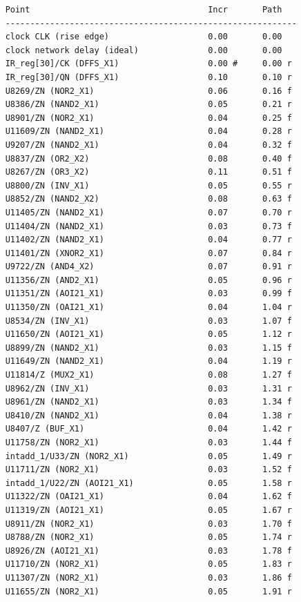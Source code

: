 \begin{lstlisting}
	Point                                    Incr       Path
	-----------------------------------------------------------
	clock CLK (rise edge)                    0.00       0.00
	clock network delay (ideal)              0.00       0.00
	IR_reg[30]/CK (DFFS_X1)                  0.00 #     0.00 r
	IR_reg[30]/QN (DFFS_X1)                  0.10       0.10 r
	U8269/ZN (NOR2_X1)                       0.06       0.16 f
	U8386/ZN (NAND2_X1)                      0.05       0.21 r
	U8901/ZN (NOR2_X1)                       0.04       0.25 f
	U11609/ZN (NAND2_X1)                     0.04       0.28 r
	U9207/ZN (NAND2_X1)                      0.04       0.32 f
	U8837/ZN (OR2_X2)                        0.08       0.40 f
	U8267/ZN (OR3_X2)                        0.11       0.51 f
	U8800/ZN (INV_X1)                        0.05       0.55 r
	U8852/ZN (NAND2_X2)                      0.08       0.63 f
	U11405/ZN (NAND2_X1)                     0.07       0.70 r
	U11404/ZN (NAND2_X1)                     0.03       0.73 f
	U11402/ZN (NAND2_X1)                     0.04       0.77 r
	U11401/ZN (XNOR2_X1)                     0.07       0.84 r
	U9722/ZN (AND4_X2)                       0.07       0.91 r
	U11356/ZN (AND2_X1)                      0.05       0.96 r
	U11351/ZN (AOI21_X1)                     0.03       0.99 f
	U11350/ZN (OAI21_X1)                     0.04       1.04 r
	U8534/ZN (INV_X1)                        0.03       1.07 f
	U11650/ZN (AOI21_X1)                     0.05       1.12 r
	U8899/ZN (NAND2_X1)                      0.03       1.15 f
	U11649/ZN (NAND2_X1)                     0.04       1.19 r
	U11814/Z (MUX2_X1)                       0.08       1.27 f
	U8962/ZN (INV_X1)                        0.03       1.31 r
	U8961/ZN (NAND2_X1)                      0.03       1.34 f
	U8410/ZN (NAND2_X1)                      0.04       1.38 r
	U8407/Z (BUF_X1)                         0.04       1.42 r
	U11758/ZN (NOR2_X1)                      0.03       1.44 f
	intadd_1/U33/ZN (NOR2_X1)                0.05       1.49 r
	U11711/ZN (NOR2_X1)                      0.03       1.52 f
	intadd_1/U22/ZN (AOI21_X1)               0.05       1.58 r
	U11322/ZN (OAI21_X1)                     0.04       1.62 f
	U11319/ZN (AOI21_X1)                     0.05       1.67 r
	U8911/ZN (NOR2_X1)                       0.03       1.70 f
	U8788/ZN (NOR2_X1)                       0.05       1.74 r
	U8926/ZN (AOI21_X1)                      0.03       1.78 f
	U11710/ZN (NOR2_X1)                      0.05       1.83 r
	U11307/ZN (NOR2_X1)                      0.03       1.86 f
	U11655/ZN (NOR2_X1)                      0.05       1.91 r

\end{lstlisting}
